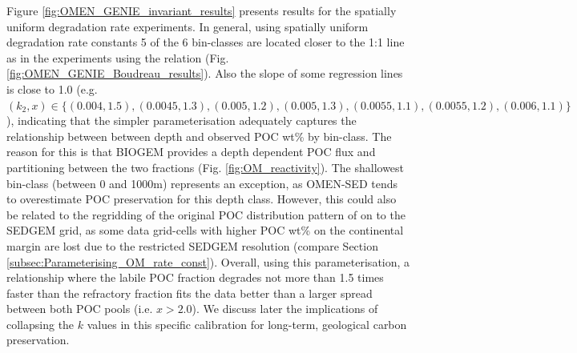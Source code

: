 \documentclass[gmd, manuscript]{copernicus}
\begin{document}
Figure \ref{fig:OMEN_GENIE_invariant_results} presents results for the spatially uniform degradation rate experiments. 
In general, using spatially uniform degradation rate constants 5 of the 6 bin-classes are located closer to the 1:1 line as in the experiments using the \citet{boudreau1997diagenetic} relation (Fig. \ref{fig:OMEN_GENIE_Boudreau_results}). 
Also the slope of some regression lines is close to 1.0 (e.g. $(k_2, x) \in \{ (0.004, 1.5),  (0.0045, 1.3), (0.005, 1.2), (0.005, 1.3), (0.0055, 1.1), (0.0055, 1.2), (0.006, 1.1)\}$), indicating that the simpler parameterisation adequately 
captures the relationship between between depth and observed POC wt\% by bin-class. The reason for this is that BIOGEM provides a depth dependent POC flux and partitioning between the two fractions (Fig. \ref{fig:OM_reactivity}). 
The shallowest bin-class (between 0 and 1000m) represents an exception, as OMEN-SED tends to overestimate POC preservation for this depth class. However, this could also be related to the regridding of the original POC distribution 
pattern of \citep{seiter_organic_2004} on to the SEDGEM grid, as some data grid-cells with higher POC wt\% on the continental margin are lost due to the restricted SEDGEM resolution (compare Section \ref{subsec:Parameterising_OM_rate_const}). 
Overall, using this parameterisation, a relationship where the labile POC fraction degrades not more than 1.5 times faster than the refractory fraction fits the 
\citet{seiter_organic_2004} data better than a larger spread between both POC pools (i.e. $x > 2.0$). 
We discuss later the implications of collapsing the $k$ values in this specific calibration for long-term, geological carbon preservation. 
\end{document}
